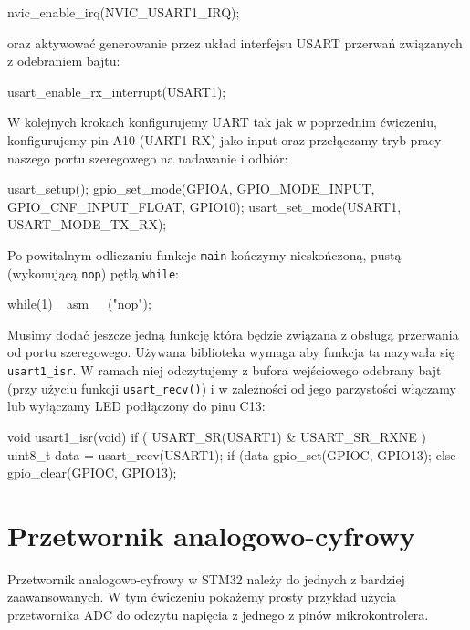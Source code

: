 \documentclass{pdfBooklets}
\begin{document}
\begin{CodeFrame*}[c]{}
  nvic_enable_irq(NVIC_USART1_IRQ);
\end{CodeFrame*}
oraz aktywować generowanie przez układ interfejsu USART przerwań związanych z odebraniem bajtu:

\begin{CodeFrame*}[c]{}
  usart_enable_rx_interrupt(USART1);
\end{CodeFrame*}

W kolejnych krokach konfigurujemy UART tak jak w poprzednim ćwiczeniu, konfigurujemy pin A10 (UART1 RX) jako input oraz przełączamy tryb pracy naszego portu szeregowego na nadawanie i odbiór:

\begin{CodeFrame*}[c]{}
  usart_setup();
  gpio_set_mode(GPIOA, GPIO_MODE_INPUT, GPIO_CNF_INPUT_FLOAT, GPIO10);
  usart_set_mode(USART1, USART_MODE_TX_RX);
\end{CodeFrame*}

Po powitalnym odliczaniu funkcje \Verb$main$ kończymy nieskończoną, pustą (wykonującą \Verb$nop$) pętlą \Verb$while$:

\begin{CodeFrame*}[c]{}
  while(1)
      _asm__("nop");
\end{CodeFrame*}

Musimy dodać jeszcze jedną funkcję która będzie związana z obsługą przerwania od portu szeregowego.
Używana biblioteka wymaga aby funkcja ta nazywała się \Verb#usart1_isr#.
W ramach niej odczytujemy z bufora wejściowego odebrany bajt (przy użyciu funkcji \Verb$usart_recv()$) i w zależności od jego parzystości włączamy lub wyłączamy LED podłączony do pinu C13:

\begin{CodeFrame*}[c]{}
  void usart1_isr(void) {
    if ( USART_SR(USART1) & USART_SR_RXNE ) {
      uint8_t data = usart_recv(USART1);
      if (data%
        gpio_set(GPIOC, GPIO13);
      else
        gpio_clear(GPIOC, GPIO13);
    }
  }
\end{CodeFrame*}



\section{Przetwornik analogowo-cyfrowy}
Przetwornik analogowo-cyfrowy w STM32 należy do jednych z bardziej zaawansowanych. W tym ćwiczeniu pokażemy prosty przykład
użycia przetwornika ADC do odczytu napięcia z jednego z pinów mikrokontrolera.
\end{document}
